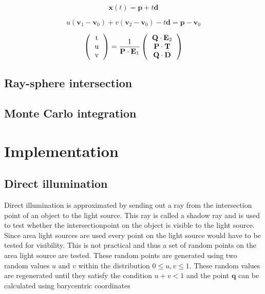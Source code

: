 \documentclass[twocolumn]{article}
\begin{document}
\begin{equation}
	\mathbf{x}(t) = \mathbf{p} + t\mathbf{d}
\end{equation}

\begin{equation}
	u(\mathbf{v}_1 - \mathbf{v}_0) + v(\mathbf{v}_2 - \mathbf{v}_0) - t\mathbf{d} = \mathbf{p} - \mathbf{v}_0
\end{equation}

\[ 
\left(
  \begin{tabular}{c}
  t \\
  u \\
  v 
  \end{tabular}
\right)
= \frac{1}{\mathbf{P} \cdot \mathbf{E}_1}
\left(
  \begin{tabular}{c}
  $\mathbf{Q} \cdot \mathbf{E}_2$ \\
  $\mathbf{P} \cdot \mathbf{T}$ \\
  $\mathbf{Q} \cdot \mathbf{D}$ 
  \end{tabular}
\right)
\]

\subsection{Ray-sphere intersection}

\subsection{Monte Carlo integration}

\section{Implementation}

\subsection{Direct illumination}
Direct illumination is approximated by sending out a ray from the intersection point of an object to the light source. This ray is called a shadow ray and is used to test whether the intersectionpoint on the object is visible to the light source. Since area light sources are used every point on the light source would have to be tested for visibility. This is not practical and thus a set of random points on the area light source are tested. These random points are generated using two random values $u$ and $v$ within the distribution $0 \leq u,v \leq 1$. These random values are regenerated until they satisfy the condition $u + v < 1$ and the point $\mathbf{q}$ can be calculated using barycentric coordinates
\end{document}

